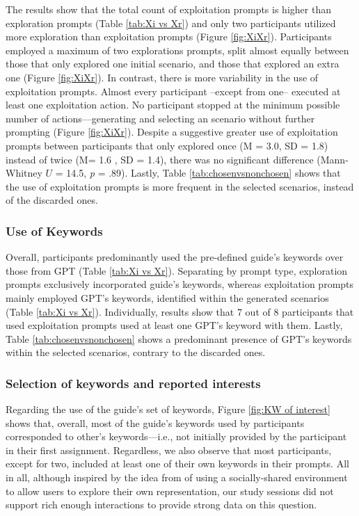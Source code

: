 \documentclass[sn-mathphys, Numbered]{sn-jnl}%
\theoremstyle{thmstyleone}%
\theoremstyle{thmstyletwo}%
\theoremstyle{thmstylethree}%
\begin{document}
The results show that the total count of exploitation prompts is higher than exploration prompts (Table \ref{tab:Xi vs Xr}) and only two participants utilized more exploration than exploitation prompts (Figure \ref{fig:XiXr}). Participants employed a maximum of two explorations prompts, split almost equally between those that only explored one initial scenario, and those that explored an extra one (Figure \ref{fig:XiXr}). 
In contrast, there is more variability in the use of exploitation prompts.  Almost every participant –except from one– executed at least one exploitation action. No participant stopped at the minimum possible number of actions---generating and selecting an scenario without further prompting (Figure \ref{fig:XiXr}).  Despite a suggestive greater use of exploitation prompts between participants that only explored once (M = 3.0, SD = 1.8) instead of twice (M= 1.6 , SD = 1.4), there was no significant difference (Mann-Whitney $U$ = 14.5, \textit{p} = .89). Lastly, Table \ref{tab:chosenvsnonchosen} shows that the use of exploitation prompts is more frequent in the selected scenarios, instead of the discarded ones.



\subsubsection*{Use of Keywords}
Overall, participants predominantly used the pre-defined guide's keywords over those from GPT (Table \ref{tab:Xi vs Xr}). Separating by prompt type, exploration prompts exclusively incorporated guide's keywords, whereas exploitation prompts mainly employed GPT's keywords, identified within the generated scenarios (Table \ref{tab:Xi vs Xr}). Individually, results show that 7 out of 8 participants that used exploitation prompts used at least one GPT's keyword with them.
Lastly, Table \ref{tab:chosenvsnonchosen} shows a predominant presence of GPT's keywords within the selected scenarios, contrary to the discarded ones. 


\subsubsection*{Selection of keywords and reported interests}

Regarding the use of the guide's set of keywords, Figure \ref{fig:KW of interest} shows that, overall, most of the guide's keywords used by participants corresponded to other's keywords---i.e., not initially provided by the participant in their first assignment. Regardless, we also observe that most participants, except for two, included at least one of their own keywords in their prompts. All in all, although inspired by the idea from  \textcite{niemi_artificial_2023} of using a socially-shared environment to allow users to explore their own representation, our study sessions did not support rich enough interactions to provide strong data on this question.
\end{document}
